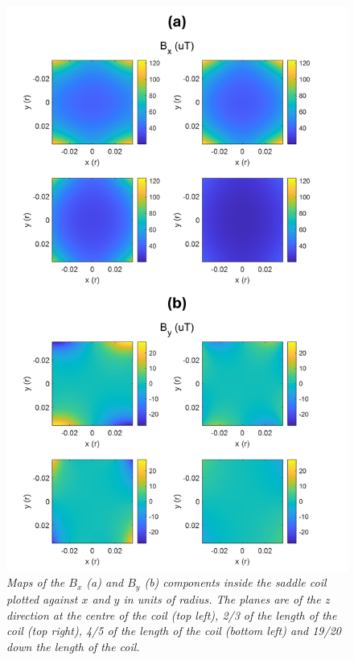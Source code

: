 \begin{figure}[H]
    \centering
    \includegraphics[width=0.85\linewidth]{Figures/Coils/Saddle_BMap.png}
    \caption{\textit{Maps of the $B_x$ (a) and $B_y$ (b) components inside the saddle coil plotted against $x$ and $y$ in units of radius. The planes are of the z direction at the centre of the coil (top left), 2/3 of the length of the coil (top right), 4/5 of the length of the coil (bottom left) and 19/20 down the length of the coil.}}
    \label{fig:coils:Saddle_BMap}
\end{figure}

